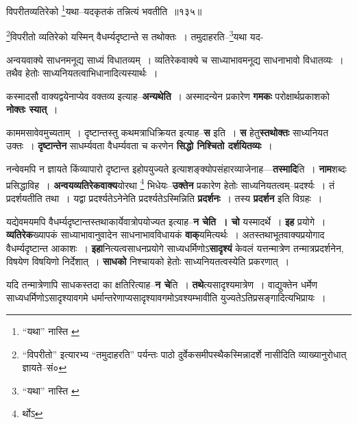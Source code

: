 \documentclass[article,12pt,a4paper]{memoir}
\begin{document}
	  \bigskip
	  \begingroup
	

	  \pstart विपरीतव्यतिरेको \footnote{“यथा” नास्ति \cite{dp-msD}}यथा--यदकृतकं तन्नित्यं भवतीति ॥१३५॥
	\pend
      
	  \endgroup
	 

	  \pstart \footnote{“विपरीतो” इत्यारभ्य “तमुदाहरति” पर्यन्तः पाठो दुर्वेकसमीपस्थैकस्मिन्नादर्शे नासीदिति व्याख्यानुरोधात् ज्ञायते--सं०}विपरीतो व्यतिरेको यस्मिन् वैधर्म्यदृष्टान्ते स तथोक्तः । तमुदाहरति--\footnote{“यथा” नास्ति \cite{dp-msA} \cite{dp-msB} \cite{dp-edP} \cite{dp-edH} \cite{dp-edE} \cite{dp-edN}}यथा यद-
	\pend
      
	  \endgroup
	

	  \pstart अन्वयवाक्ये साधनमनूद्य साध्यं विधातव्यम् । व्यतिरेकवाक्ये च साध्याभावमनूद्य साधनाभावो विधातव्यः । तथैव हेतोः साध्यनियतत्वाभिधानादित्यस्यार्थः ।
	\pend
      

	  \pstart कस्मादसौ वाक्यद्वयेनाप्येव वक्तव्य इत्याह--\textbf{अन्यथेति} । अस्मादन्येन प्रकारेण \textbf{गमकः} परोक्षार्थप्रकाशको \textbf{नोक्तः स्यात्} ।
	\pend
      

	  \pstart काममसावेवमुच्यताम् । दृष्टान्तस्तु कथमत्राधिक्रियत इत्याह--\textbf{स} इति । \textbf{स} हेतु\textbf{स्तथोक्तः} साध्यनियत उक्तः । \textbf{दृष्टान्तेन} साधर्म्यवता वैधर्म्यवता च करणेन \textbf{सिद्धो निश्चितो दर्शयितव्यः} ।
	\pend
      

	  \pstart नन्वेवमपि न ज्ञायते किंव्यापारो दृष्टान्त इहोपयुज्यते इत्याशङ्क्योपसंहारव्याजेनाह—\textbf{तस्मादि}ति । \textbf{नाम}शब्दः प्रसिद्धाविह । \textbf{अन्वयव्यतिरेकवाक्य}योरथा \footnote{र्थोऽ} भिधेयः--\textbf{उक्तेन} प्रकारेण हेतोः साध्यनियतत्वम्--प्रदर्श्यः । तं प्रदर्शयतीति तथा । यद्वा प्रदर्श्यतेऽनेनेति प्रदर्श्यतेऽस्मिन्निति \textbf{प्रदर्शनः} । तस्य \textbf{प्रदर्शन} इति विग्रहः ।
	\pend
      

	  \pstart यद्येवमयमपि वैधर्म्यदृष्टान्तस्तथाकार्येवात्रोपयोज्यत इत्याह--\textbf{न चेति । चो} यस्मादर्थे । \textbf{इह} प्रयोगे । \textbf{व्यतिरेक}ख्यापकं साध्याभावानुवादेन साधनाभावविधायकं \textbf{वाक्}यमित्यर्थः । अतस्तथाभूतवाक्यप्रयोगाद वैधर्म्यदृष्टान्त आकाशः । \textbf{इहा}नित्यत्वसाधनप्रयोगे साध्यधर्मिणोऽ\textbf{सादृश्यं} केवलं यत्तन्मात्रेण तन्मात्रप्रदर्शनेन, विषयेण विषयिणो निर्देशात् । \textbf{साधको} निश्चायको हेतोः साध्यनियतत्वस्येति प्रकरणात् ।
	\pend
      

	  \pstart यदि तन्मात्रेणापि साधकस्तदा का क्षतिरित्याह--\textbf{न चे}ति । \textbf{तथे}त्यसादृश्यमात्रेण । वाद्युक्तेन धर्मेण साध्यधर्मिणोऽसादृश्यावगमे धर्मान्तरेणाप्यसादृश्यावगमोऽवश्यम्भावीति युज्यतेऽतिप्रसङ्गादित्यभिप्रायः ।
	\pend
      \leavevmode{}
	  \bigskip
	  \begingroup
	
\end{document}
